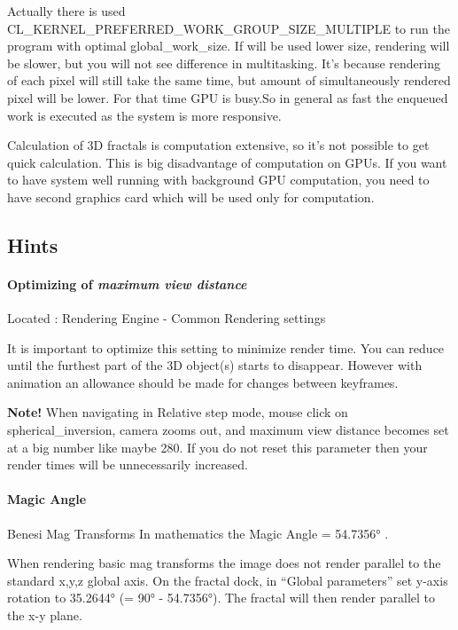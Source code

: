 Actually there is used CL_KERNEL_PREFERRED_WORK_GROUP_SIZE_MULTIPLE to run the program with optimal global_work_size. If will be used lower size, rendering will be slower, but you will not see difference in multitasking. It's because rendering of each pixel will still take the same time, but amount of simultaneously rendered pixel will be lower. For that time GPU is busy.So in general as fast the enqueued work is executed as the system is more responsive.

Calculation of 3D fractals is computation extensive, so it's not possible to get quick calculation.
This is big disadvantage of computation on GPUs.
If you want to have system well running with background GPU computation, you need to have second graphics card which will be used only for computation.


\subsection{Hints}\label{Hints}

\paragraph{Optimizing of \emph{maximum view distance}} Located : Rendering
Engine - Common Rendering settings

It is important to optimize this setting to minimize render time. You can reduce
until the furthest part of the 3D object(s) starts to disappear. However with
animation an allowance should be made for changes between keyframes.

\textbf{Note!} When navigating in Relative step mode, mouse click on
spherical\_inversion, camera zooms out, and maximum view distance becomes set at a big number like maybe 280. If you do not reset this parameter then your render times will be unnecessarily increased.


\paragraph{Magic Angle} Benesi Mag Transforms
In mathematics the Magic Angle = 54.7356° .

When rendering basic mag transforms the image does not render parallel to the
standard x,y,z global axis. On the fractal dock, in ``Global parameters'' set
y-axis rotation to 35.2644° (= 90° - 54.7356°). The fractal will then render
parallel to the x-y plane.

